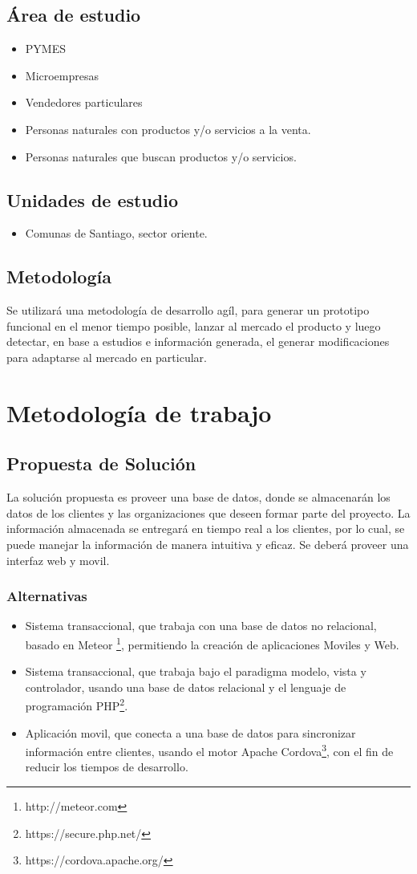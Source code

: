 \documentclass[letterpaper,openright,10pt,oneside]{report}
\begin{document}
		\section{Área de estudio}
			\begin{itemize}
				\item PYMES
				\item Microempresas
				\item Vendedores particulares
				\item Personas naturales con productos y/o servicios a la venta.
				\item Personas naturales que buscan productos y/o servicios.
			\end{itemize}		
		\section{Unidades de estudio}
			\begin{itemize}
				\item Comunas de Santiago, sector oriente.
			\end{itemize}
		\section{Metodología}
			Se utilizará una metodología de desarrollo agíl, para generar un prototipo funcional en el menor tiempo posible, lanzar al mercado el producto y luego detectar, en base a estudios e información generada, el generar modificaciones para adaptarse al mercado en particular.
	\chapter{Metodología de trabajo}
		\section{Propuesta de Solución}
			La solución propuesta es proveer una base de datos, donde se almacenarán los datos de los clientes y las organizaciones que deseen formar parte del proyecto. La información almacenada se entregará en tiempo real a los clientes, por lo cual, se puede manejar la información de manera intuitiva y eficaz. Se deberá proveer una interfaz web y movil.
			\subsection{Alternativas}
				\begin{itemize}
					\item Sistema transaccional, que trabaja con una base de datos no relacional, basado en Meteor \footnote{http://meteor.com}, permitiendo la creación de aplicaciones Moviles y Web.
					\item Sistema transaccional, que trabaja bajo el paradigma modelo, vista y controlador, usando una base de datos relacional y el lenguaje de programación PHP\footnote{https://secure.php.net/}.
					\item Aplicación movil, que conecta a una base de datos para sincronizar información entre clientes, usando el motor Apache Cordova\footnote{https://cordova.apache.org/}, con el fin de reducir los tiempos de desarrollo.
				\end{itemize}
\end{document}
